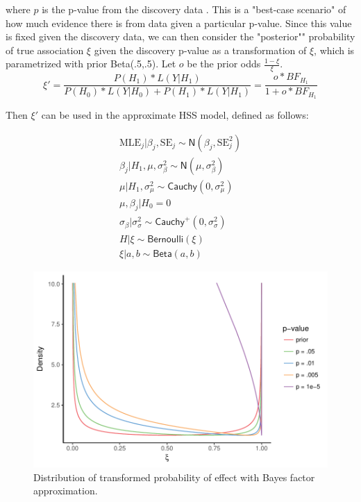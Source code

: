 \documentclass[AMA,STIX1COL]{WileyNJD-v2}\usepackage[]{graphicx}\usepackage[]{color}
\newenvironment{knitrout}{}{} %
\begin{document}
where $p$ is the p-value from the discovery data \cite{sellke2001calibration}. This is a "best-case scenario" of how much evidence there is from data given a particular p-value. Since this value is fixed given the discovery data, we can then consider the "posterior"" probability of true association $\xi$ given the discovery p-value as a transformation of $\xi$, which is parametrized with prior Beta(.5,.5). Let $o$ be the prior odds $\frac{1-\xi}{\xi}$.
\begin{equation}\label{eq8}
\xi' = \frac{P(H_1)*L(Y|H_1)}{P(H_0)*L(Y|H_0)+P(H_1)*L(Y|H_1)} = \frac{o*BF_{H_1}}{1+o*BF_{H_1}}
\end{equation}

Then $\xi'$ can be used in the approximate HSS model, defined as follows:


\begin{gather}\label{eq3.1}
\text{MLE}_j | \beta_j,\text{SE}_j \sim \textsf{N}(\beta_j,\text{SE}_j^2)\\
\beta_{j}|H_ 1,\mu, \sigma_{\beta}^{2} \sim \textsf{N}(\mu, \sigma_{\beta}^{2}) \\
\mu|H_1,\sigma_{\mu}^{2} \sim \textsf{Cauchy}(0,\sigma_{\mu}^{2})\\
\mu, \beta_{j}|H_0  =0\\
\sigma_{\beta}| \sigma_{\sigma}^{2}\sim \textsf{Cauchy}^+(0,\sigma_{\sigma}^{2})\\
H|\xi\sim \textsf{Bernoulli}(\xi)\\
\xi|a, b \sim \textsf{Beta}(a, b)
\end{gather}

\begin{figure}
\caption{Distribution of transformed probability of effect with Bayes factor approximation.}
\begin{knitrout}
\color{fgcolor}

{\centering \includegraphics[width=6in]{figure/unnamed-chunk-4-1} 

}



\end{knitrout}
\end{figure}
\end{document}
